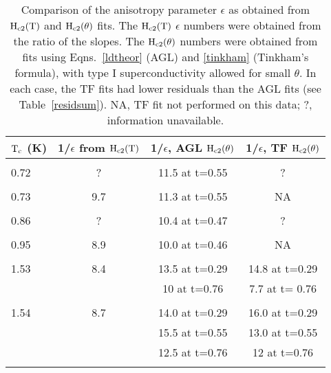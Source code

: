 \pagestyle{empty}

\begin{table}
\caption[Comparison of the anisotropy parameter $\epsilon$ as obtained from
$\rm  H_{c2}(T)$   and  $\rm   H_{c2}(\theta)$  fits.]{Comparison    of the
anisotropy parameter  $\epsilon$ as  obtained from $\rm H_{c2}(T)$ and $\rm
H_{c2}(\theta)$ fits.  The $\rm H_{c2}(T)$ $\epsilon$ numbers were obtained
from the ratio  of  the    slopes.  The $\rm H_{c2}(\theta)$ numbers   were
obtained   from  fits  using  Eqns.~\ref{ldtheor}  (AGL) and  \ref{tinkham}
(Tinkham's  formula), with   type  I  superconductivity allowed  for  small
$\theta$.  In each case, the TF fits had lower  residuals than the AGL fits
(see Table~\ref{residsum}).   NA, TF  fit   not performed on this data;  ?,
information unavailable.}
\label{epsilontab}
\begin{center}
\begin{tabular}{|l|ccc|}
\hline
$\rm T_c$ (K) & 1/$\epsilon$ from $\rm H_{c2}(T)$ & 1/$\epsilon$, AGL $\rm
H_{c2}(\theta)$ & 1/$\epsilon$, TF $\rm H_{c2}(\theta)$  \\
\hline
& & & \\
0.72\cite{iye82} & ? & 11.5 at t=0.55 & ? \\
& & & \\
0.73\cite{iye82} & 9.7 & 11.3 at t=0.55 & NA \\
& & & \\
0.86\cite{iye82} & ? & 10.4 at t=0.47 & ? \\
& & & \\
0.95 & 8.9 & 10.0 at t=0.46 & NA \\
& & & \\
1.53 & 8.4 & 13.5 at t=0.29 & 14.8 at t=0.29 \\
& & 10 at t=0.76 & 7.7 at t= 0.76 \\
& & & \\
1.54 & 8.7 & 14.0 at t=0.29 & 16.0 at t=0.29\\
& & 15.5 at t=0.55  & 13.0 at t=0.55\\
& & 12.5 at t=0.76 & 12 at t=0.76\\
& & & \\
\hline
\end{tabular}
\end{center}
\end{table}

